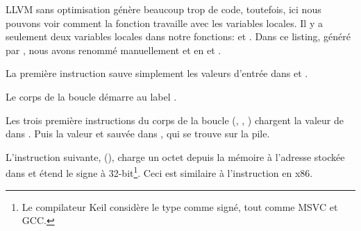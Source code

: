 ﻿

\mysubparagraph{\NonOptimizingXcodeIV (\ARMMode)}



LLVM sans optimisation génère beaucoup trop de code, toutefois, ici nous pouvons
voir comment la fonction travaille avec les variables locales.
Il y a seulement deux variables locales dans notre fonctions:  et .
Dans ce listing, généré par \IDA, nous avons renommé manuellement  et
 en  et .

La première instruction sauve simplement les valeurs d'entrée dans  et .

Le corps de la boucle démarre au label .

Les trois première instructions du corps de la boucle (, \ADD, )
chargent la valeur de  dans .
Puis la valeur  et sauvée dans , qui se trouve
sur la pile.

L'instruction suivante,  (), charge
un octet depuis la mémoire à l'adresse stockée dans  et étend le signe à
32-bit\footnote{Le compilateur Keil considère le type \Tchar comme signé, tout
comme MSVC et GCC.}.
Ceci est similaire à l'instruction \MOVSX en x86.

